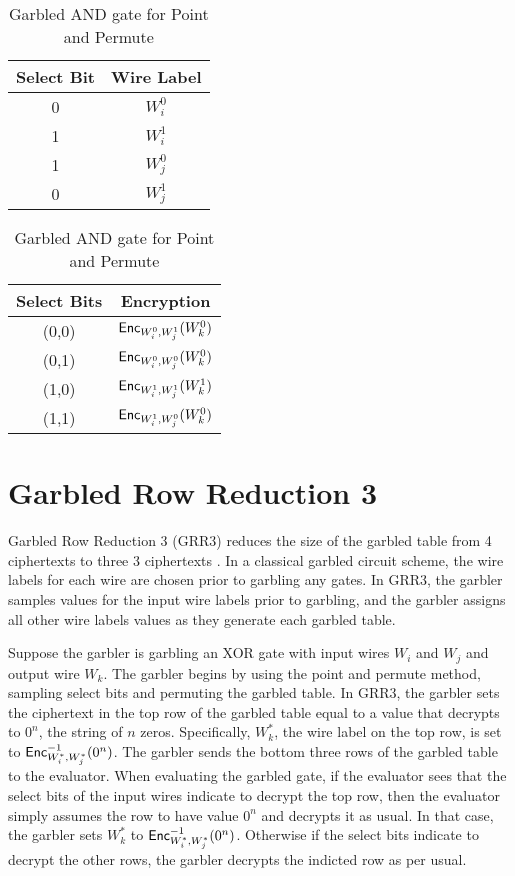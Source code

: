 \begin{table}
    \label{tbl:point-and-permute}
    \centering
    \begin{tabular}{|c|c|}
        \hline
        Select Bit & Wire Label \\
        \hline
        0 & $W_i^0$ \\
        1 & $W_i^1$ \\
        1 & $W_j^0$ \\
        0 & $W_j^1$ \\
        \hline
    \end{tabular}
    \qquad
    \begin{tabular}{|c|c|}
        \hline
        Select Bits & Encryption \\
        \hline
        (0,0) & $\textsf{Enc}_{W_i^0, W_j^1}(W_k^0)$ \\
        (0,1) & $\textsf{Enc}_{W_i^0, W_j^0}(W_k^0)$ \\
        (1,0) & $\textsf{Enc}_{W_i^1, W_j^1}(W_k^1)$ \\
        (1,1) & $\textsf{Enc}_{W_i^1, W_j^0}(W_k^0)$ \\
        \hline
    \end{tabular}
    \caption[Garbled table with point and permute]{Garbled AND gate for Point and Permute}
\end{table}

\section{Garbled Row Reduction 3}
Garbled Row Reduction 3 (GRR3) reduces the size of the garbled table from 4 ciphertexts to three 3 ciphertexts \cite{grr}.
In a classical garbled circuit scheme, the wire labels for each wire are chosen prior to garbling any gates.
In GRR3, the garbler samples values for the input wire labels prior to garbling, and the garbler assigns all other wire labels values as they generate each garbled table.

Suppose the garbler is garbling an XOR gate with input wires $W_i$ and $W_j$ and output wire $W_k$.
The garbler begins by using the point and permute method, sampling select bits and permuting the garbled table.
In GRR3, the garbler sets the ciphertext in the top row of the garbled table equal to a value that decrypts to $0^n$, the string of $n$ zeros.
Specifically, $W_k^*$, the wire label on the top row, is set to $\textsf{Enc}^{-1}_{W_i^*, W_j^*}(0^n)$.
The garbler sends the bottom three rows of the garbled table to the evaluator.
When evaluating the garbled gate, if the evaluator sees that the select bits of the input wires indicate to decrypt the top row, then the evaluator simply assumes the row to have value $0^n$ and decrypts it as usual.
In that case, the garbler sets $W_k^*$ to $\textsf{Enc}^{-1}_{W_i^*, W_j^*}(0^n)$.
Otherwise if the select bits indicate to decrypt the other rows, the garbler decrypts the indicted row as per usual.

